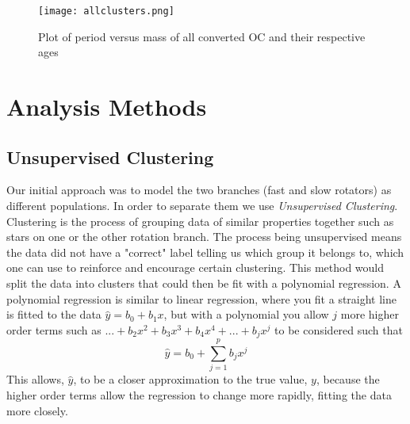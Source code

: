 \documentclass[fleqn,usenatbib]{mnras}
\begin{document}
\begin{figure}
	\centering
	\texttt{[image: allclusters.png]}
	\caption[]{Plot of period versus mass of all converted OC and their respective ages}
	\label{fig:allclusters}
\end{figure}


\section{Analysis Methods}
\subsection{Unsupervised Clustering}
Our initial approach was to model the two branches (fast and slow rotators) as different populations. In order to separate them we use \textit{Unsupervised Clustering}.
Clustering is the process of grouping data of similar properties together such as stars on one or the other rotation branch.
The process being unsupervised means the data did not have a "correct" label telling us which group it belongs to, which one can use to reinforce and encourage certain clustering.
This method would split the data into clusters that could then be fit with a polynomial regression.
A polynomial regression is similar to linear regression, where you fit a straight line is fitted to the data $\hat{y} = b_0 + b_1x$, but with a polynomial you allow $j$ more higher order terms such as $...+ b_2x^2 + b_3x^3+b_4x^4+...+b_jx^j $ to be considered such that
\begin{equation}
	\label{eq:poly}
	\hat{y} = b_0 + \sum_{j = 1}^p b_jx^j
\end{equation}
This allows, $\hat{y}$, to be a closer approximation to the true value, $y$, because the higher order terms allow the regression to change more rapidly, fitting the data more closely.
\end{document}
